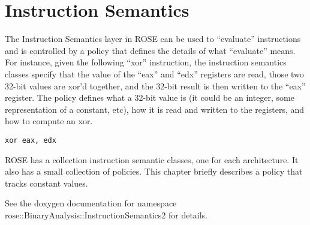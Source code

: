 \chapter{Instruction Semantics}

The Instruction Semantics layer in ROSE can be used to ``evaluate''
instructions and is controlled by a policy that defines the details of
what ``evaluate'' means.  For instance, given the following ``xor''
instruction, the instruction semantics classes specify that the
value of the ``eax'' and ``edx'' registers are read, those two 32-bit
values are xor'd together, and the 32-bit result is then written to
the ``eax'' register. The policy defines what a 32-bit value is (it
could be an integer, some representation of a constant, etc), how it
is read and written to the registers, and how to compute an xor.

\begin{verbatim}
xor eax, edx
\end{verbatim}

ROSE has a collection instruction semantic classes, one for each
architecture. It also has a small collection of policies.  This
chapter briefly describes a policy that tracks constant values.

See the doxygen documentation for namespace
rose::BinaryAnalysis::InstructionSemantics2 for details.
